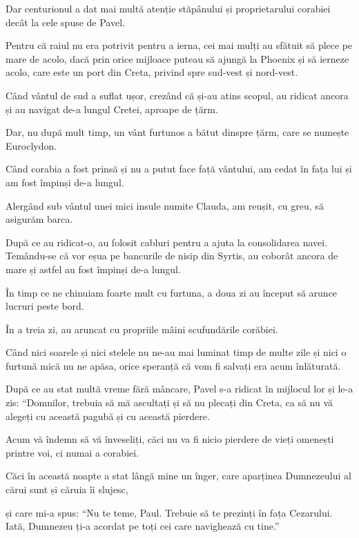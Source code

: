 {Dar centurionul a dat mai multă atenție stăpânului și proprietarului corabiei decât la cele spuse de Pavel.

Pentru că raiul nu era potrivit pentru a ierna, cei mai mulți au sfătuit să plece pe mare de acolo, dacă prin orice mijloace puteau să ajungă la Phoenix și să ierneze acolo, care este un port din Creta, privind spre sud-vest și nord-vest.


\par }{\PP {}Când vântul de sud a suflat ușor, crezând că și-au atins scopul, au ridicat ancora și au navigat de-a lungul Cretei, aproape de țărm.

Dar, nu după mult timp, un vânt furtunos a bătut dinspre țărm, care se numește Euroclydon.

Când corabia a fost prinsă și nu a putut face față vântului, am cedat în fața lui și am fost împinși de-a lungul.

Alergând sub vântul unei mici insule numite Clauda, am reușit, cu greu, să asigurăm barca.

După ce au ridicat-o, au folosit cabluri pentru a ajuta la consolidarea navei. Temându-se că vor eșua pe bancurile de nisip din Syrtis, au coborât ancora de mare și astfel au fost împinși de-a lungul.

În timp ce ne chinuiam foarte mult cu furtuna, a doua zi au început să arunce lucruri peste bord.

În a treia zi, au aruncat cu propriile mâini scufundările corăbiei.

Când nici soarele și nici stelele nu ne-au mai luminat timp de multe zile și nici o furtună mică nu ne apăsa, orice speranță că vom fi salvați era acum înlăturată.


\par }{\PP {}După ce au stat multă vreme fără mâncare, Pavel s-a ridicat în mijlocul lor și le-a zis: “Domnilor, trebuia să mă ascultați și să nu plecați din Creta, ca să nu vă alegeți cu această pagubă și cu această pierdere.

Acum vă îndemn să vă înveseliți, căci nu va fi nicio pierdere de vieți omenești printre voi, ci numai a corabiei.

Căci în această noapte a stat lângă mine un înger, care aparținea Dumnezeului al cărui sunt și căruia îi slujesc,

și care mi-a spus: “Nu te teme, Paul. Trebuie să te prezinți în fața Cezarului. Iată, Dumnezeu ți-a acordat pe toți cei care navighează cu tine.”

}
